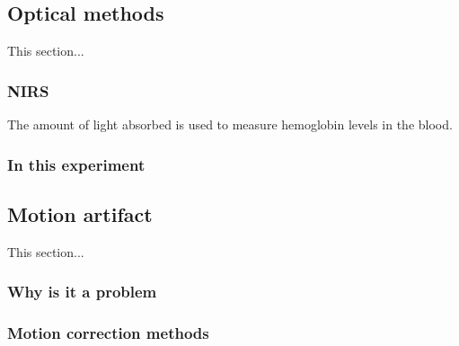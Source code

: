 \subsection{Optical methods}
This section...
\subsubsection{NIRS}
The amount of light absorbed is used to measure hemoglobin levels in the blood. 
\subsubsection{In this experiment}


\subsection{Motion artifact}
This section...
\subsubsection{Why is it a problem}
\subsubsection{Motion correction methods}